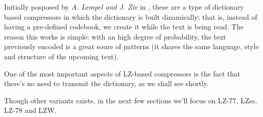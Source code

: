 \documentclass{subfiles}
\begin{document}
    Initially posposed by \emph{A. Lempel \emph{and} J. Ziv} in \cite{lempel1976, lempel1977, lempel1978},
        these are a type of dictionary based compressors in which the dictionary is built dinamically;
        that is, instead of having a pre-defined codebook, we create it while the text is being read.
        The reason this works is simple: with an high degree of probability,
        the text previously encoded is a great soure of patterns 
        (it shares the same language, style and structure of the upcoming text).

    One of the most important aspects of LZ-based compressors
        is the fact that there's no need to transmit the dictionary, 
        as we shall see shortly.

    \begin{remark*}
        Though other variants exists, 
            in the next few sections we'll focus on LZ-77, LZss, LZ-78 and LZW.
    \end{remark*}
\end{document}
